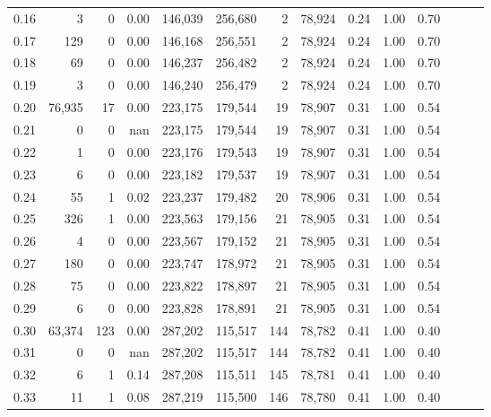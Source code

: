 \begin{tabular}{rrrrrrrrrrrrrr}
0.16 &       3 &       0 &  0.00 &  146,039 &  256,680 &       2 &  78,924 &  0.24 &  1.00 &      0.70 \\
0.17 &     129 &       0 &  0.00 &  146,168 &  256,551 &       2 &  78,924 &  0.24 &  1.00 &      0.70 \\
0.18 &      69 &       0 &  0.00 &  146,237 &  256,482 &       2 &  78,924 &  0.24 &  1.00 &      0.70 \\
0.19 &       3 &       0 &  0.00 &  146,240 &  256,479 &       2 &  78,924 &  0.24 &  1.00 &      0.70 \\
0.20 &  76,935 &      17 &  0.00 &  223,175 &  179,544 &      19 &  78,907 &  0.31 &  1.00 &      0.54 \\
0.21 &       0 &       0 &   nan &  223,175 &  179,544 &      19 &  78,907 &  0.31 &  1.00 &      0.54 \\
0.22 &       1 &       0 &  0.00 &  223,176 &  179,543 &      19 &  78,907 &  0.31 &  1.00 &      0.54 \\
0.23 &       6 &       0 &  0.00 &  223,182 &  179,537 &      19 &  78,907 &  0.31 &  1.00 &      0.54 \\
0.24 &      55 &       1 &  0.02 &  223,237 &  179,482 &      20 &  78,906 &  0.31 &  1.00 &      0.54 \\
0.25 &     326 &       1 &  0.00 &  223,563 &  179,156 &      21 &  78,905 &  0.31 &  1.00 &      0.54 \\
0.26 &       4 &       0 &  0.00 &  223,567 &  179,152 &      21 &  78,905 &  0.31 &  1.00 &      0.54 \\
0.27 &     180 &       0 &  0.00 &  223,747 &  178,972 &      21 &  78,905 &  0.31 &  1.00 &      0.54 \\
0.28 &      75 &       0 &  0.00 &  223,822 &  178,897 &      21 &  78,905 &  0.31 &  1.00 &      0.54 \\
0.29 &       6 &       0 &  0.00 &  223,828 &  178,891 &      21 &  78,905 &  0.31 &  1.00 &      0.54 \\
0.30 &  63,374 &     123 &  0.00 &  287,202 &  115,517 &     144 &  78,782 &  0.41 &  1.00 &      0.40 \\
0.31 &       0 &       0 &   nan &  287,202 &  115,517 &     144 &  78,782 &  0.41 &  1.00 &      0.40 \\
0.32 &       6 &       1 &  0.14 &  287,208 &  115,511 &     145 &  78,781 &  0.41 &  1.00 &      0.40 \\
0.33 &      11 &       1 &  0.08 &  287,219 &  115,500 &     146 &  78,780 &  0.41 &  1.00 &      0.40 \\

\end{tabular}
